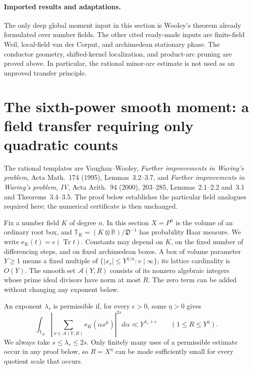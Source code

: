\documentclass[11pt,reqno]{amsart}
\numberwithin{equation}{section}
\theoremstyle{definition}
\begin{document}
\paragraph{Imported results and adaptations.}
The only deep global moment input in this section is Wooley's theorem already
formulated over number fields.  The other cited ready-made inputs are finite-field
Weil, local-field van der Corput, and archimedean stationary phase.
The conductor geometry, shifted-kernel localization, and product-arc pruning
are proved above.  In particular, the rational minor-arc estimate is not used
as an unproved transfer principle.


\section{The sixth-power smooth moment: a field transfer requiring only quadratic counts}
\label{sec:g6-transfer}

The rational templates are Vaughan--Wooley, \emph{Further improvements in
Waring's problem}, Acta Math.~174 (1995), Lemmas~3.2--3.7, and
\emph{Further improvements in Waring's problem, IV}, Acta Arith.~94
(2000), 203--285, Lemmas~2.1--2.2 and~3.1 and Theorems~3.4--3.5.
The proof below establishes the particular field analogues required here;
the numerical certificate is then unchanged.

Fix a number field $K$ of degree $n$.  In this section $X=P^n$ is the
volume of an ordinary root box, and $\mathbb T_K=(K\otimes\mathbb R)/\mathfrak D^{-1}$
has probability Haar measure.  We write $\mathrm e_K(t)=e(\operatorname{Tr}t)$.
Constants may depend on $K$, on the fixed number of differencing steps, and on
fixed archimedean boxes.  A box of volume parameter $Y\ge1$ means a fixed
multiple of $\{|x_v|\le Y^{1/n}:v\mid\infty\}$; its lattice cardinality is $O(Y)$.
The smooth set $\mathcal A(Y,R)$ consists of its nonzero algebraic integers
whose prime ideal divisors have norm at most $R$.  The zero term can be added
without changing any exponent below.

An exponent $\lambda_s$ is permissible if, for every $\epsilon>0$, some
$\eta>0$ gives
\[
 \int_{\mathbb T_K}\left|\sum_{x\in\mathcal A(Y,R)}\mathrm e_K(\alpha x^6)\right|^{2s}
 d\alpha\ll Y^{\lambda_s+\epsilon}
 \qquad(1\le R\le Y^\eta).
\]
We always take $s\le\lambda_s\le2s$.  Only finitely many uses of a permissible
estimate occur in any proof below, so $R=X^\eta$ can be made sufficiently small
for every quotient scale that occurs.
\end{document}
